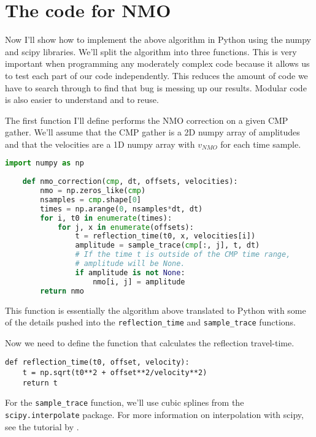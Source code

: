 \section{The code for NMO}

Now I'll show how to implement the above algorithm in Python using the numpy and scipy libraries.
We'll split the algorithm into three functions.
This is very important when programming any moderately complex code because it allows us to test each part of our code independently.
This reduces the amount of code we have to search through to find that bug is messing up our results.
Modular code is also easier to understand and to reuse.

The first function I'll define performs the NMO correction on a given CMP gather.
We'll assume that the CMP gather is a 2D numpy array of amplitudes and that the
velocities are a 1D numpy array with $v_{NMO}$ for each time sample.

\begin{lstlisting}[language=python]
    import numpy as np
    
    def nmo_correction(cmp, dt, offsets, velocities):
        nmo = np.zeros_like(cmp)
        nsamples = cmp.shape[0]
        times = np.arange(0, nsamples*dt, dt)
        for i, t0 in enumerate(times):
            for j, x in enumerate(offsets):
                t = reflection_time(t0, x, velocities[i])
                amplitude = sample_trace(cmp[:, j], t, dt)
                # If the time t is outside of the CMP time range,
                # amplitude will be None.
                if amplitude is not None:
                    nmo[i, j] = amplitude
        return nmo
\end{lstlisting}

This function is essentially the algorithm above translated to Python with some
of the details pushed into the \texttt{reflection_time} and
\texttt{sample_trace} functions.

Now we need to define the function that calculates the reflection travel-time.

\begin{verbatim}
def reflection_time(t0, offset, velocity):
    t = np.sqrt(t0**2 + offset**2/velocity**2)
    return t
\end{verbatim}

For the \texttt{sample_trace} function, we'll use cubic splines from the
\texttt{scipy.interpolate} package.
For more information on interpolation with scipy, see the tutorial by
\citet{Hall_2016}.

